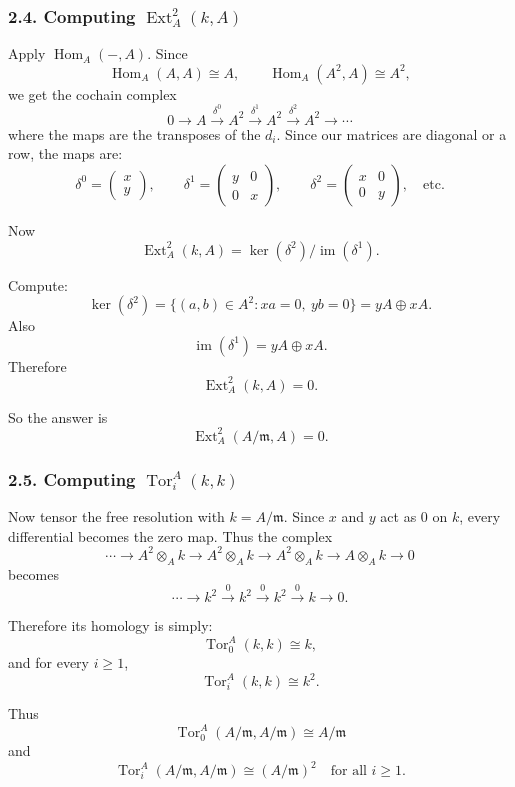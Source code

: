 \documentclass[12pt,a4paper]{article}
\theoremstyle{notespace}
\DeclareMathOperator{\Hom}{Hom}
\DeclareMathOperator{\Tor}{Tor}
\DeclareMathOperator{\Ext}{Ext}
\begin{document}
\subsubsection{2.4. Computing \(\Ext_A^2(k,A)\)}

Apply \(\Hom_A(-,A)\). Since
\[
\Hom_A(A,A)\cong A,
\qquad
\Hom_A(A^2,A)\cong A^2,
\]
we get the cochain complex
\[
0 \longrightarrow A
\xrightarrow{\delta^0}
A^2
\xrightarrow{\delta^1}
A^2
\xrightarrow{\delta^2}
A^2
\longrightarrow \cdots
\]
where the maps are the transposes of the \(d_i\). Since our matrices are diagonal or a row, the maps are:
\[
\delta^0=
\begin{pmatrix}
	x\\
	y
\end{pmatrix},
\qquad
\delta^1=
\begin{pmatrix}
	y & 0\\
	0 & x
\end{pmatrix},
\qquad
\delta^2=
\begin{pmatrix}
	x & 0\\
	0 & y
\end{pmatrix},
\quad \text{etc.}
\]

Now
\[
\Ext_A^2(k,A)=\ker(\delta^2)/\operatorname{im}(\delta^1).
\]

Compute:
\[
\ker(\delta^2)=\{(a,b)\in A^2 : xa=0,\ yb=0\}
=
yA\oplus xA.
\]
Also
\[
\operatorname{im}(\delta^1)=yA\oplus xA.
\]
Therefore
\[
\Ext_A^2(k,A)=0.
\]

So the answer is
\[
\boxed{\Ext_A^2(A/\mathfrak m,A)=0.}
\]

\subsubsection{2.5. Computing \(\Tor_i^A(k,k)\)}

Now tensor the free resolution with \(k=A/\mathfrak m\). Since \(x\) and \(y\) act as \(0\) on \(k\), every differential becomes the zero map. Thus the complex
\[
\cdots
\longrightarrow A^2\otimes_A k
\longrightarrow A^2\otimes_A k
\longrightarrow A^2\otimes_A k
\longrightarrow A\otimes_A k
\longrightarrow 0
\]
becomes
\[
\cdots
\longrightarrow k^2
\xrightarrow{0}
k^2
\xrightarrow{0}
k^2
\xrightarrow{0}
k
\longrightarrow 0.
\]

Therefore its homology is simply:
\[
\Tor_0^A(k,k)\cong k,
\]
and for every \(i\ge 1\),
\[
\Tor_i^A(k,k)\cong k^2.
\]

Thus
\[
\boxed{
	\Tor_0^A(A/\mathfrak m,A/\mathfrak m)\cong A/\mathfrak m
}
\]
and
\[
\boxed{
	\Tor_i^A(A/\mathfrak m,A/\mathfrak m)\cong (A/\mathfrak m)^2
	\quad \text{for all } i\ge 1.
}
\]
\end{document}

